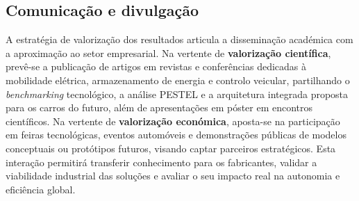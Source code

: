 \subsection{Comunicação e divulgação}
\begin{campotexto}
A estratégia de valorização dos resultados articula a disseminação académica com a aproximação ao setor empresarial. Na vertente de \textbf{valorização científica}, prevê-se a publicação de artigos em revistas e conferências dedicadas à mobilidade elétrica, armazenamento de energia e controlo veicular, partilhando o \textit{benchmarking} tecnológico, a análise PESTEL e a arquitetura integrada proposta para os carros do futuro, além de apresentações em póster em encontros científicos. Na vertente de \textbf{valorização económica}, aposta-se na participação em feiras tecnológicas, eventos automóveis e demonstrações públicas de modelos conceptuais ou protótipos futuros, visando captar parceiros estratégicos. Esta interação permitirá transferir conhecimento para os fabricantes, validar a viabilidade industrial das soluções e avaliar o seu impacto real na autonomia e eficiência global.
\end{campotexto}
